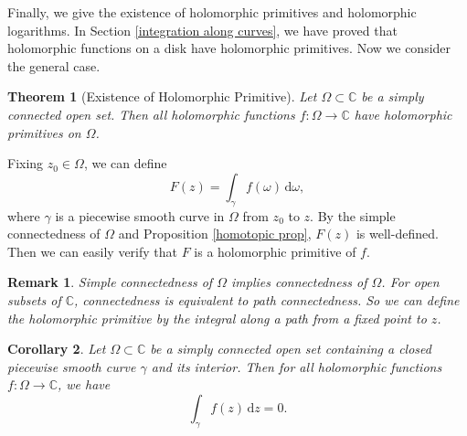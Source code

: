 \documentclass{article}
\newtheorem{theorem}{Theorem}[section]
\newtheorem{corollary}[theorem]{Corollary}
\newtheorem*{remark}{Remark}
\theoremstyle{definition}
\newcommand{\C}{\mathbb{C}}
\newcommand{\dd}{\mathrm{d}}
\begin{document}
Finally, we give the existence of holomorphic primitives and holomorphic logarithms. In Section \ref{integration along curves}, we have proved that holomorphic functions on a disk have holomorphic primitives. Now we consider the general case.
\begin{theorem}[Existence of Holomorphic Primitive]\label{th:primitive}
Let \(\Omega\subset\C\) be a simply connected open set. Then all holomorphic functions \(f\colon\Omega\to\C\) have holomorphic primitives on \(\Omega\).
\end{theorem}
Fixing $z_0 \in \Omega$, we can define
\begin{equation*}
    F(z) = \int_{\gamma} f(\omega)\, \dd \omega,
\end{equation*}
where \(\gamma\) is a piecewise smooth curve in \(\Omega\) from \(z_0\) to \(z\). By the simple connectedness of \(\Omega\) and Proposition \ref{homotopic prop}, \(F(z)\) is well-defined. Then we can easily verify that \(F\) is a holomorphic primitive of \(f\).
\begin{remark}
    Simple connectedness of \(\Omega\) implies connectedness of \(\Omega\). For open subsets of $\C$, connectedness is equivalent to path connectedness. So we can define the holomorphic primitive by the integral along a path from a fixed point to \(z\).
\end{remark}
\begin{corollary}
Let \(\Omega\subset\C\) be a simply connected open set containing a closed piecewise smooth curve $\gamma$ and its interior. Then for all holomorphic functions \(f\colon\Omega\to\C\), we have
\begin{equation*}
    \int_{\gamma} f(z)\, \dd z = 0.
\end{equation*}
\end{corollary}
\end{document}
